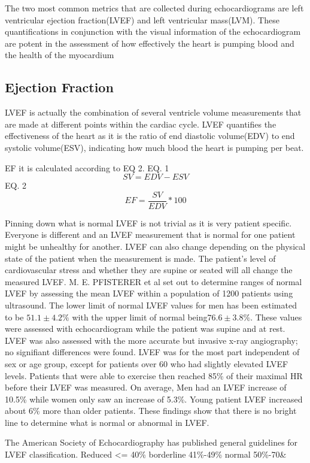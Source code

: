 \documentclass[12pt]{article}
\begin{document}
The two most common metrics that are collected during echocardiograms are left ventricular ejection fraction(LVEF) and left ventricular mass(LVM).\cite{ase_chamber_quant_update}
These quantifications in conjunction with the visual information of the echocardiogram are potent in the assessment of how effectively the heart is pumping blood and the health of the myocardium

\subsection{Ejection Fraction}
LVEF is actually the combination of several ventricle volume measurements that are made at different points within the cardiac cycle.
LVEF quantifies the effectiveness of the heart as it is the ratio of end diastolic volume(EDV) to end systolic volume(ESV), indicating how much blood the heart is pumping per beat.

EF it is calculated according to EQ 2.
EQ. 1
\[SV = EDV - ESV\]
EQ. 2
\[EF = \frac{SV}{EDV} * 100   \]  

Pinning down what is normal LVEF is not trivial as it is very patient specific.
Everyone is different and an LVEF measurement that is normal for one patient might be unhealthy for another.
LVEF can also change depending on the physical state of the patient when the measurement is made.
The patient's level of cardiovascular stress and whether they are supine or seated will all change the measured LVEF.
M. E. PFISTERER et al set out to determine ranges of normal LVEF by assessing the mean LVEF within a population of 1200 patients using ultrasound.
The lower limit of normal LVEF values for men has been estimated to be $ 51.1 \pm 4.2\%$ with the upper limit of normal being$ 76.6 \pm 3.8\%$.
These values were assessed with echocardiogram while the patient was supine and at rest.
LVEF was also assessed with the more accurate but invasive x-ray angiography; no signifiant differences were found.
LVEF was for the most part independent of sex or age group, except for patients over 60 who had slightly elevated LVEF levels.
Patients that were able to exercise then reached 85\% of their maximal HR before their LVEF was measured.
On average, Men had an LVEF increase of 10.5\% while women only saw an increase of 5.3\%.
Young patient LVEF increased about 6\% more than older patients\cite{norm_EF_values}.
These findings show that there is no bright line to determine what is normal or abnormal in LVEF.

The American Society of Echocardiography has published general guidelines for LVEF classification.
Reduced <= 40\%
borderline 41\%-49\%
normal 50\%-70\&
\end{document}
